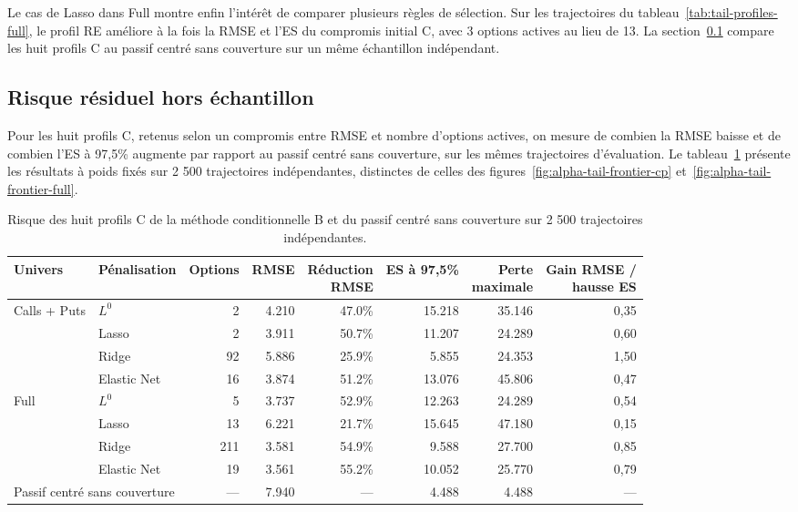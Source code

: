 \documentclass[12pt,a4paper]{article}
\newcommand{\RMSE}{\operatorname{RMSE}}
\newcommand{\1}{\mathbf{1}}
\begin{document}
Le cas de Lasso dans Full montre enfin l’intérêt de comparer plusieurs règles de sélection. Sur les trajectoires du tableau~\ref{tab:tail-profiles-full}, le profil RE améliore à la fois la RMSE et l’ES du compromis initial C, avec 3 options actives au lieu de 13. La section~\ref{sec:out-of-sample-risk} compare les huit profils C au passif centré sans couverture sur un même échantillon indépendant.


\FloatBarrier

\subsection{Risque résiduel hors échantillon}\label{sec:out-of-sample-risk}

Pour les huit profils C, retenus selon un compromis entre RMSE et nombre d’options actives, on mesure de combien la RMSE baisse et de combien l’ES à 97,5\% augmente par rapport au passif centré sans couverture, sur les mêmes trajectoires d’évaluation. Le tableau~\ref{tab:risk} présente les résultats à poids fixés sur 2 500 trajectoires indépendantes, distinctes de celles des figures~\ref{fig:alpha-tail-frontier-cp} et~\ref{fig:alpha-tail-frontier-full}.

\begin{table}[H]
\centering
\small
\setlength{\tabcolsep}{3pt}
\begin{tabular}{llrrrrrr}
\toprule
Univers & Pénalisation & Options & RMSE & \shortstack[r]{Réduction\\RMSE} & ES à 97,5\% & \shortstack[r]{Perte\\maximale} & \shortstack[r]{Gain RMSE /\\hausse ES} \\
\midrule
Calls + Puts & $L^0$ & 2 & 4.210 & 47.0\% & 15.218 & 35.146 & 0,35 \\
 & Lasso & 2 & 3.911 & 50.7\% & 11.207 & 24.289 & 0,60 \\
 & Ridge & 92 & 5.886 & 25.9\% & 5.855 & 24.353 & 1,50 \\
 & Elastic Net & 16 & 3.874 & 51.2\% & 13.076 & 45.806 & 0,47 \\
\addlinespace[2pt]
Full & $L^0$ & 5 & 3.737 & 52.9\% & 12.263 & 24.289 & 0,54 \\
 & Lasso & 13 & 6.221 & 21.7\% & 15.645 & 47.180 & 0,15 \\
 & Ridge & 211 & 3.581 & 54.9\% & 9.588 & 27.700 & 0,85 \\
 & Elastic Net & 19 & 3.561 & 55.2\% & 10.052 & 25.770 & 0,79 \\
\midrule
\multicolumn{2}{l}{Passif centré sans couverture} & --- & 7.940 & --- & 4.488 & 4.488 & --- \\
\bottomrule
\end{tabular}
\caption{Risque des huit profils C de la méthode conditionnelle B et du passif centré sans couverture sur 2 500 trajectoires indépendantes.}
\label{tab:risk}
\end{table}
\end{document}
